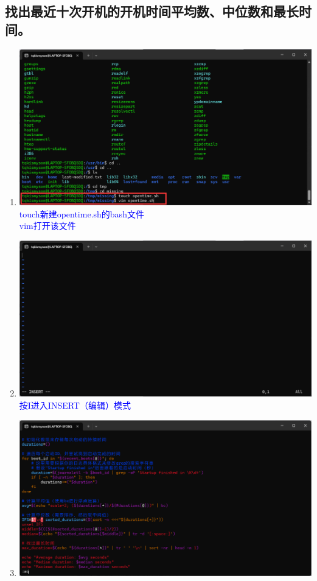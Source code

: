 \documentclass[12pt,a4paper,UTF8]{article}
\begin{document}
    \subsection{找出最近十次开机的开机时间平均数、中位数和最长时间。}
    \begin{enumerate}
        \item 
        \includegraphics[scale=0.25]{pictures/Shell/7_1.png}
        \textcolor{blue}{touch新建opentime.sh的bash文件}\\
        \textcolor{blue}{vim打开该文件}\\[8pt]
        \item 
        \includegraphics[scale=0.25]{pictures/Shell/7_2.png}
        \textcolor{blue}{按I进入INSERT（编辑）模式}\\[8pt]
        \item 
        \includegraphics[scale=0.25]{pictures/Shell/7_3.png}

\end{enumerate}
\end{document}
